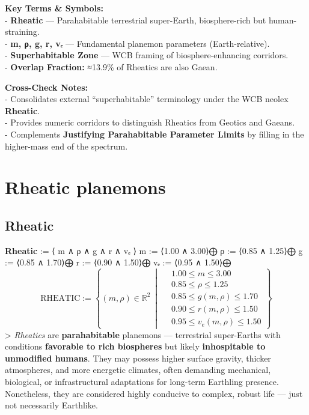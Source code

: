 \documentclass[
  letterpaper,
]{book}
\begin{document}
\textbf{Key Terms \& Symbols:}\\
- \textbf{Rheatic} --- Parahabitable terrestrial super-Earth,
biosphere-rich but human-straining.\\
- \textbf{m, ρ, g, r, vₑ} --- Fundamental planemon parameters
(Earth-relative).\\
- \textbf{Superhabitable Zone} --- WCB framing of biosphere-enhancing
corridors.\\
- \textbf{Overlap Fraction:} ≈13.9\% of Rheatics are also Gaean.

\textbf{Cross-Check Notes:}\\
- Consolidates external ``superhabitable'' terminology under the WCB
neolex \textbf{Rheatic}.\\
- Provides numeric corridors to distinguish Rheatics from Geotics and
Gaeans.\\
- Complements \textbf{Justifying Parahabitable Parameter Limits} by
filling in the higher-mass end of the spectrum.

\chapter{Rheatic planemons}\label{rheatic-planemons}

\section{Rheatic}\label{rheatic}

\textbf{Rheatic} := ⟨ m ∧ ρ ∧ g ∧ r ∧ vₑ ⟩ m := ⟨1.00 ∧ 3.00⟩⨁ ρ :=
⟨0.85 ∧ 1.25⟩⨁ g := ⟨0.85 ∧ 1.70⟩⨁ r := ⟨0.90 ∧ 1.50⟩⨁ vₑ := ⟨0.95 ∧
1.50⟩⨁
\[\text{RHEATIC} := \left\{ (m, \rho) \in \mathbb{R}^2 \ \middle|\
\begin{aligned}
&1.00 \leq m \leq 3.00 \\
&0.85 \leq \rho \leq 1.25 \\
&0.85 \leq g(m, \rho) \leq 1.70 \\
&0.90 \leq r(m, \rho) \leq 1.50 \\
&0.95 \leq v_e(m, \rho) \leq 1.50
\end{aligned}
\right\}
\] \textgreater{} \emph{Rheatics} are \textbf{parahabitable} planemons
--- terrestrial super-Earths with conditions \textbf{favorable to rich
biospheres} but likely \textbf{inhospitable to unmodified humans}. They
may possess higher surface gravity, thicker atmospheres, and more
energetic climates, often demanding mechanical, biological, or
infrastructural adaptations for long-term Earthling presence.
Nonetheless, they are considered highly conducive to complex, robust
life --- just not necessarily Earthlike.
\end{document}
